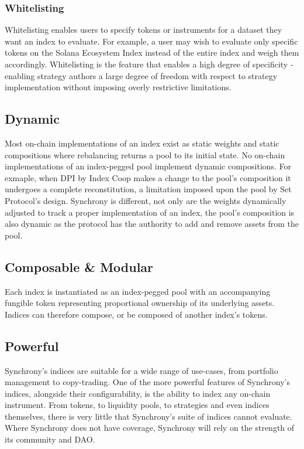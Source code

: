 \documentclass[10pt]{article}
\begin{document}
					\subsubsection{Whitelisting}
					Whitelisting enables users to specify tokens or instruments for a dataset they
					want an index to evaluate. For example, a user may wish to evaluate only
					specific tokens on the Solana Ecosystem Index instead of the entire index and
					weigh them accordingly. Whitelisting is the feature that enables a high degree
					of specificity - enabling strategy authors a large degree of freedom with
					respect to strategy implementation without imposing overly restrictive
					limitations.

					\subsection{Dynamic}
					Most on-chain implementations of an index exist as static weights and static
					compositions where rebalancing returns a pool to its initial state. No on-chain
					implementations of an index-pegged pool implement dynamic compositions. For
					exmaple, when DPI by Index Coop makes a change to the pool's composition it
					undergoes a complete reconstitution, a limitation imposed upon the pool by Set
					Protocol's design. Synchrony is different, not only are the weights dynamically
					adjusted to track a proper implementation of an index, the pool's composition is
					also dynamic as the protocol has the authority to add and remove assets from the
					pool.

					\subsection{Composable \& Modular}
					Each index is instantiated as an index-pegged pool with an accompanying fungible
					token representing proportional ownership of its underlying assets. Indices can
					therefore compose, or be composed of another index's tokens.

					\subsection{Powerful}
					Synchrony's indices are suitable for a wide range of use-cases, from portfolio
					management to copy-trading. One of the more powerful features of Synchrony's
					indices, alongside their configurability, is the ability to index any on-chain
					instrument. From tokens, to liquidity pools, to strategies and even indices
					themselves, there is very little that Synchrony's suite of indices cannot
					evaluate. Where Synchrony does not have coverage, Synchrony will rely on the
					strength of its community and DAO.
					
\end{document}

